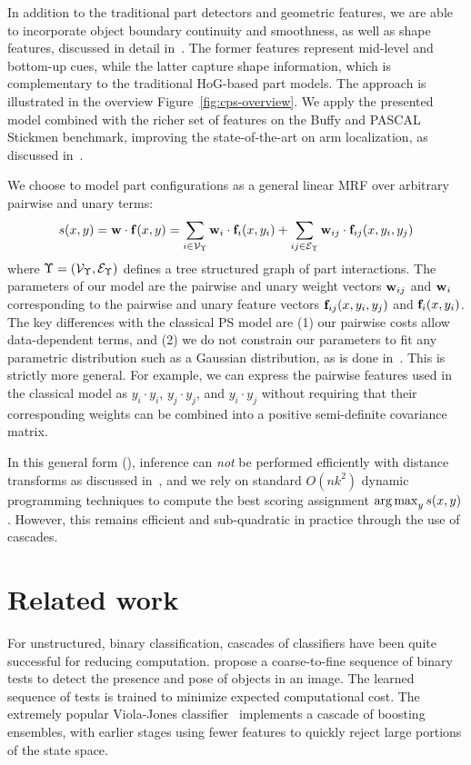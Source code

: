 In addition to the traditional part detectors and geometric features, we are 
able to incorporate object boundary continuity and smoothness, as well as shape 
features, discussed in detail in~. The former features 
represent mid-level and bottom-up cues, while the latter capture shape 
information, which is complementary to the traditional HoG-based part models.  
The approach is illustrated in the overview Figure~\ref{fig:cps-overview}. We 
apply the presented \CPS model combined with the richer set of features on the 
Buffy and PASCAL Stickmen benchmark, improving the state-of-the-art on arm 
localization, as discussed in~. 

\label{subsec:our_ps}
We choose to model part configurations as a general linear MRF over arbitrary 
pairwise and unary terms:
\begin{align}
s(x,y)  = \mathbf{w} \cdot \mathbf{f}(x,y) = \sum_{i \in \mathcal{V}_\Upsilon} \mathbf{w}_i \cdot \mathbf{f}_i(x,y_i)  + 
\sum_{ij \in \mathcal{E}_\Upsilon} \mathbf{w}_{ij} \cdot \mathbf{f}_{ij}(x,y_i,y_j)
\label{eq:cps}
\end{align}
where $\Upsilon = (\mathcal{V}_\Upsilon,\mathcal{E}_\Upsilon)$ defines a tree structured graph of part 
interactions.  The parameters of our model are the pairwise and unary weight 
vectors $\mathbf{w}_{ij}$ and $\mathbf{w}_i$ corresponding to the pairwise and unary feature 
vectors $\mathbf{f}_{ij}(x,y_i,y_j)$ and $\mathbf{f}_i(x,y_i)$.   The key differences with the 
classical PS model are (1) our pairwise costs allow data-dependent terms, and 
(2) we do not constrain our parameters to fit any parametric distribution such 
as a Gaussian distribution, as is done 
in~\citet{felz05,devacrf,andriluka09,eichner09}.  This is strictly more 
general.  For example, we can express the pairwise features used in the 
classical model as $y_{i} \cdot y_{i}$, $y_{j}\cdot y_{j}$, and $y_{i}\cdot 
y_{j}$ without requiring that their corresponding weights can be combined into 
a positive semi-definite covariance matrix.

In this general form (), inference can {\em not} be performed 
efficiently with distance transforms as discussed 
in~, and we rely on standard $O(nk^2)$ dynamic programming 
techniques to compute the best scoring assignment $\mathop{\arg\max}_y s(x,y)$.  However, this remains efficient and sub-quadratic in practice through the use of cascades.

\section{Related work}
For unstructured, binary classification, cascades of classifiers have been 
quite successful for reducing computation.  \citet{geman2001} propose a 
coarse-to-fine sequence of binary tests to detect the presence and pose of 
objects in an image.  The learned sequence of tests is trained to minimize 
expected computational cost.  The extremely popular Viola-Jones 
classifier~\citep{viola02} implements a cascade of boosting ensembles, with 
earlier stages using fewer features to quickly reject large portions of the 
state space.

